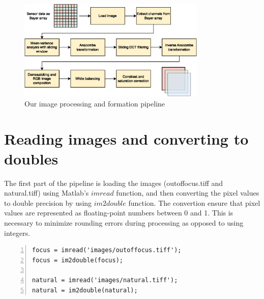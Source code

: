 \documentclass[12pt,a4paper,english
]{tunithesis}
\begin{document}
\begin{figure}[h]
  \centering
  \includegraphics[width=0.8\textwidth]{img/image_pipeline.eps}
  \caption{Our image processing and formation pipeline}
  \label{fig:pipeline}
\end{figure}

\section{Reading images and converting to doubles}
The first part of the pipeline is loading the images (outoffocus.tiff and natural.tiff) using Matlab's $imread$ function, and then converting the pixel values to double precision by using $im2double$ function. The convertion ensure that pixel values are represented as floating-point numbers between 0 and 1. This is necessary to minimize rounding errors during processing as opposed to using integers.
\begin{lstlisting}[style=Matlab-editor, numbers=left, basicstyle=\small]
% 1. Load image and convert to double
focus = imread('images/outoffocus.tiff');
focus = im2double(focus);

natural = imread('images/natural.tiff');
natural = im2double(natural);
\end{lstlisting}
\end{document}
